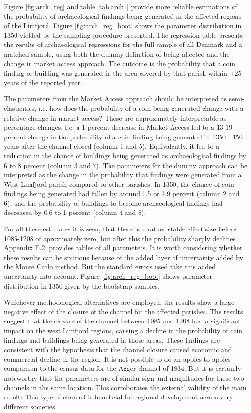 \documentclass[11pt]{article}
\begin{document}
Figure \ref{fig:arch_reg} and table \ref{tab:arch1} provide more reliable estimations of the probability of archaeological findings being generated in the affected regions of the Limfjord. Figure \ref{fig:arch_reg_boot} shows the parameter distribution in 1350 yielded by the sampling procedure presented. The regression table presents the results of archaeological regressions for the full sample of all Denmark and a matched sample, using both the dummy definition of being affected and the change in market access approach. The outcome is the probability that a coin finding or building was generated in the area covered by that parish within $\pm 25$ years of the reported year. 

The parameters from the Market Access approach should be interpreted as semi-elasticities, i.e. how does the probability of a coin being generated change with a relative change in market access? These are approximately interpretable as percentage changes. I.e. a 1 percent decrease in Market Access led to a 13-19 percent change in the probability of a coin finding being generated in 1350 - 150 years after the channel closed (column 1 and 5). Equivalently, it led to a reduction in the chance of buildings being generated as archaeological findings by 6 to 8 percent (column 3 and 7). The parameters for the dummy approach can be interpreted as the change in the probability that findings were generated from a West Limfjord parish compared to other parishes. In 1350, the chance of coin findings being generated had fallen by around 1.5 or 1.9 percent  (column 2 and 6), and the probability of buildings to become archaeological findings had decreased by 0.6 to 1 percent (column 4 and 8). 

For all these estimates it is seen, that there is a rather stable effect size before 1085-1208 of aproximately zero, but after this the probability sharply declines. Appendix E.2. provides tables of all parameters. It is worth considering whether these results can be spurious because of the added layer of uncertainty added by the Monte Carlo method. But the standard errors used take this added uncertainty into account. Figure \ref{fig:arch_reg_boot} shows parameter distribution in 1350 given by the bootstrap samples.

Whichever methodological alternatives are employed, the results show a large negative effect of the closure of the channel for the affected parishes. The results suggest that the closure of the channel between 1085 and 1208 had a significant impact on the west Limfjord regions, causing a decline in the probability of coin findings and buildings being generated in those areas. These findings are consistent with the hypothesis that the channel closure caused economic and commercial decline in the region. It is not possible to do an apples-to-apples comparison to the census data for the Agger channel of 1834. But it is certainly noteworthy that the parameters are of similar sign and magnitudes for these two channels in the same location. This corroborates the external validity of the main result: This type of channel is beneficial for regional development across very different societies. 
\end{document}
